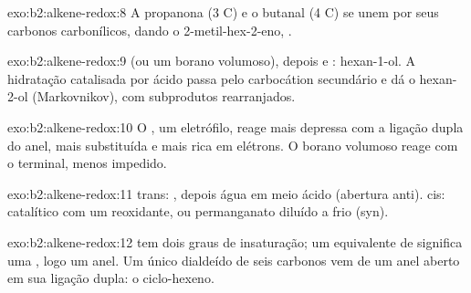 \begin{solution}{exo:b2:alkene-redox:8}
A propanona (3 C) e o butanal (4 C) se unem por seus carbonos carbonílicos,
dando o 2-metil-hex-2-eno, .
\end{solution}

\begin{solution}{exo:b2:alkene-redox:9}
 (ou um borano volumoso), depois  e : hexan-1-ol. A
hidratação catalisada por ácido passa pelo carbocátion secundário e dá o
hexan-2-ol (Markovnikov), com subprodutos rearranjados.
\end{solution}

\begin{solution}{exo:b2:alkene-redox:10}
O , um eletrófilo, reage mais depressa com a ligação dupla do anel,
mais substituída e mais rica em elétrons. O borano volumoso reage com o
 terminal, menos impedido.
\end{solution}

\begin{solution}{exo:b2:alkene-redox:11}
trans: , depois água em meio ácido (abertura anti). cis: 
catalítico com um reoxidante, ou permanganato diluído a frio (syn).
\end{solution}

\begin{solution}{exo:b2:alkene-redox:12}
 tem dois graus de insaturação; um equivalente de  significa uma
, logo um anel. Um único dialdeído de seis carbonos vem de um anel
aberto em sua ligação dupla: o ciclo-hexeno.
\end{solution}

